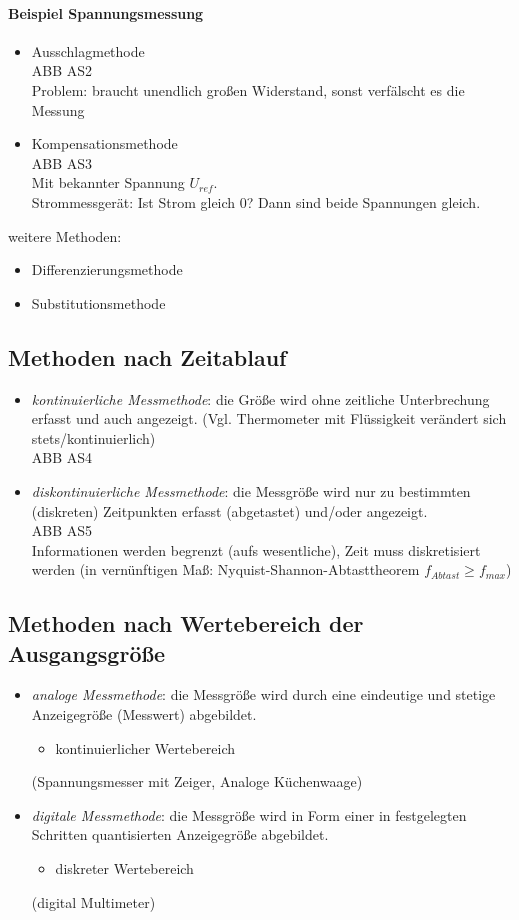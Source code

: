 \paragraph{Beispiel Spannungsmessung}
\begin{itemize}
\item Ausschlagmethode\\
ABB AS2\\
Problem: braucht unendlich großen Widerstand, sonst verfälscht es die Messung
\item Kompensationsmethode\\
ABB AS3\\
Mit bekannter Spannung $U_{ref}$.\\
Strommessgerät: Ist Strom gleich 0? Dann sind beide Spannungen gleich.
\end{itemize}
weitere Methoden:
\begin{itemize}
\item Differenzierungsmethode
\item Substitutionsmethode
\end{itemize}

\subsection{Methoden nach Zeitablauf}
\begin{itemize}
\item \emph{kontinuierliche Messmethode}: die Größe wird ohne zeitliche Unterbrechung erfasst und auch angezeigt. (Vgl. Thermometer mit Flüssigkeit verändert sich stets/kontinuierlich)\\
ABB AS4
\item \emph{diskontinuierliche Messmethode}: die Messgröße wird nur zu bestimmten (diskreten) Zeitpunkten erfasst (abgetastet) und/oder angezeigt.\\
ABB AS5\\
Informationen werden begrenzt (aufs wesentliche), Zeit muss diskretisiert werden (in vernünftigen Maß: Nyquist-Shannon-Abtasttheorem $f_{Abtast}\geq f_{max}$)
\end{itemize}

\subsection{Methoden nach Wertebereich der Ausgangsgröße}
\begin{itemize}
\item \emph{analoge Messmethode}: die Messgröße wird durch eine eindeutige und stetige Anzeigegröße (Messwert) abgebildet.
\begin{itemize}[label=\textbullet]
\item kontinuierlicher Wertebereich
\end{itemize}
(Spannungsmesser mit Zeiger, Analoge Küchenwaage)
\item \emph{digitale Messmethode}: die Messgröße wird in Form einer in festgelegten Schritten quantisierten Anzeigegröße abgebildet.
\begin{itemize}[label=\textbullet]
\item diskreter Wertebereich
\end{itemize}
(digital Multimeter)
\end{itemize}


